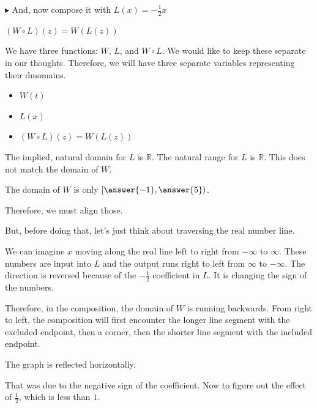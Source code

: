 \documentclass{ximera}
\begin{document}
$\blacktriangleright$ And, now compose it with $L(x) = -\frac{1}{2}x$ 



$(W \circ L)(z) = W(L(z))$



\begin{explanation}

We have three functions: $W$, $L$, and $W \circ L$.  We would like to keep these separate in our thoughts.  Therefore, we will have three separate variables representing their dmomains.


\begin{itemize}
\item $W(t)$
\item $L(x)$
\item $(W \circ L)(z) = W(L(z))$
\end{itemize}

\end{explanation}






The implied, natural domain for $L$ is \textbf{$\mathbb{R}$}.  The natural range for $L$ is \textbf{$\mathbb{R}$}. This does not match the domain of $W$.  


\begin{question}


The domain of $W$ is only $\left[ \answer{-1}, \answer{5} \right)$. 

\end{question}

Therefore, we must align those.

But, before doing that, let's just think about traversing the real number line. 

We can imagine $x$ moving along the real line left to right from $-\infty$ to $\infty$. These numbers are input into $L$ and the output runs right to left from $\infty$ to $-\infty$.  The direction is reversed because of the $-\frac{1}{2}$ coefficient in $L$.  It is changing the sign of the numbers.


Therefore, in the composition, the domain of $W$ is running backwards.  From right to left, the composition will first encounter the longer line segment with the excluded endpoint, then a corner, then the shorter line segment with the included endpoint.

The graph is reflected horizontally. 


That was due to the negative sign of the coefficient.  Now to figure out the effect of $\frac{1}{2}$, which is less than $1$.
\end{document}
